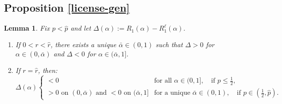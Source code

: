 \documentclass[11pt]{article}
\theoremstyle{plain}
\theoremstyle{definition}
\theoremstyle{plain}
\theoremstyle{plain}
\theoremstyle{plain}
\newtheorem{lem}[thm]{Lemma}
\theoremstyle{plain}
\numberwithin{equation}{section}
\begin{document}
\subsection*{Proposition \ref{license-gen}}

\begin{lem}\label{lem:license-boundary}
Fix $p < \hat{p}$ and let $\Delta(\alpha) := R_1(\alpha) - R_1^\ell(\alpha)$.
\begin{enumerate}
    \item If $0 < r < \hat{r}$, there exists a unique $\bar{\alpha} \in (0,1)$ such that $\Delta > 0$ for $\alpha \in (0,\bar{\alpha})$ and $\Delta < 0$ for $\alpha \in (\bar{\alpha},1]$.
    \item If $r = \hat{r}$, then:
    \begin{equation*}
        \Delta(\alpha) \begin{cases}
            < 0 & \text{for all } \alpha \in (0,1], \quad \text{if } p \leq \frac{1}{2}, \\[5pt]
            > 0 \text{ on } (0,\bar{\alpha}) \text{ and } < 0 \text{ on } (\bar{\alpha},1] & \text{for a unique } \bar{\alpha} \in (0,1), \quad \text{if } p \in \left(\frac{1}{2}, \hat{p}\right).
        \end{cases}
    \end{equation*}
\end{enumerate}
\end{lem}
\end{document}

